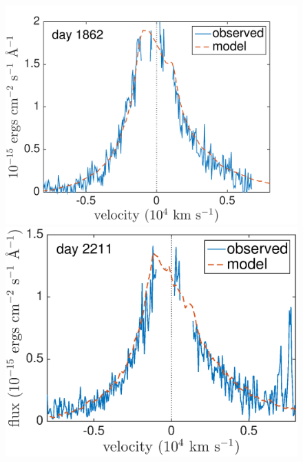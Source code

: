 \begin{figure}
\centering
\includegraphics[trim =30 35 0 0,clip=true,scale=0.39]{chapters/chapter5/images/clump_1/maximum/d1862Ha.pdf}
\includegraphics[trim =30 35 0 0,clip=true,scale=0.39]{chapters/chapter5/images/clump_1/maximum/d2211Ha}


\end{figure}
